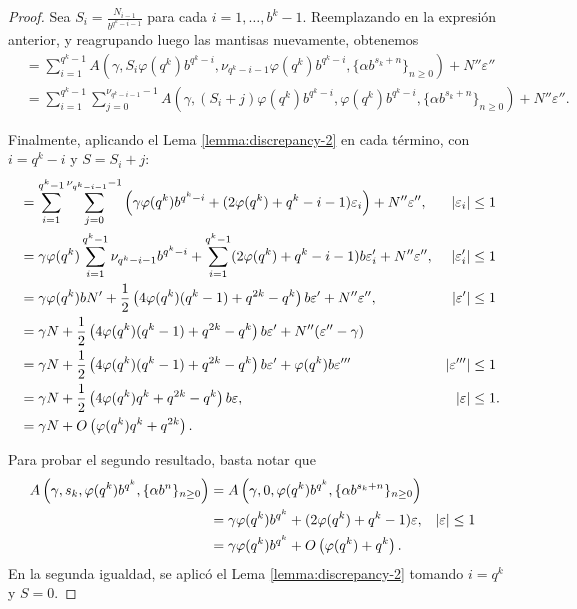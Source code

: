 \begin{proof}
Sea $S_i = \frac{N_{i-1}}{b^{q^k - i - 1}}$ para cada $i = 1, \dots, b^k - 1$.
Reemplazando en la expresión anterior, y reagrupando luego las mantisas
nuevamente, obtenemos
\begin{align*}
	&= \sum_{i=1}^{q^k-1} A\left(\gamma, S_i\varphi(q^k)b^{q^k-i},
		\nu_{q^k-i-1}\varphi(q^k)b^{q^k-i}, \lbrace \alpha b^{s_k+n}
		\rbrace_{n\geq0} \right) + N''\varepsilon'' \\
	&= \sum_{i=1}^{q^k-1} \sum_{j=0}^{\nu_{q^k-i-1}-1} A\left(\gamma,
		(S_i + j)\varphi(q^k)b^{q^k-i}, \varphi(q^k)b^{q^k-i},
		\lbrace \alpha b^{s_k+n} \rbrace_{n\geq0} \right) + N''\varepsilon''.
\end{align*}

Finalmente, aplicando el Lema \ref{lemma:discrepancy-2} en cada término,
con $i = q^k - i$ y $S = S_i + j$:
\begin{align*}
&= \sum_{i=1}^{q^k-1} \sum_{j=0}^{\nu_{q^k-i-1}-1} \left(
	\gamma\varphi(q^k)b^{q^k-i} + (2\varphi(q^k) + q^k - i - 1)\varepsilon_i
	\right) + N''\varepsilon'',
	& \vert \varepsilon_i \vert & \leq 1 \\
&= \gamma\varphi(q^k) \sum_{i=1}^{q^k-1} \nu_{q^k-i-1}b^{q^k-i} +
	\sum_{i=1}^{q^k-1} (2\varphi(q^k) + q^k - i - 1)b\varepsilon'_i
	+ N''\varepsilon'',
	& \vert \varepsilon_i' \vert & \leq 1 \\
&= \gamma\varphi(q^k)b N' + \frac{1}{2}\left(4\varphi(q^k)(q^k-1)
	+ q^{2k} - q^k \right)b\varepsilon' + N''\varepsilon'',
	& \vert \varepsilon' \vert & \leq 1 \\
&= \gamma N + \frac{1}{2}\left(4\varphi(q^k)(q^k-1)
	+ q^{2k} - q^k \right)b\varepsilon' + N''(\varepsilon'' - \gamma) \\
&= \gamma N + \frac{1}{2}\left(4\varphi(q^k)(q^k-1)
	+ q^{2k} - q^k \right)b\varepsilon' + \varphi(q^k)b\varepsilon'''
	& \vert \varepsilon''' \vert & \leq 1 \\
&= \gamma N + \frac{1}{2}\left(4\varphi(q^k)q^k
	+ q^{2k} - q^k \right)b\varepsilon,
	& \vert \varepsilon \vert & \leq 1. \\
&= \gamma N + O \left(\varphi(q^k)q^{k} + q^{2k}\right).
\end{align*}

\medskip

Para probar el segundo resultado, basta notar que
\begin{align*}
A\left(\gamma, s_k, \varphi(q^k)b^{q^k}, \lbrace \alpha b^{n} \rbrace_{n\geq0} \right)
	&= A\left(\gamma, 0, \varphi(q^k)b^{q^k}, \lbrace \alpha b^{s_k+n} \rbrace_{n\geq0} \right) \\
	&= \gamma\varphi(q^k)b^{q^k} + (2\varphi(q^k) + q^k - 1)\varepsilon,
		& \vert\varepsilon\vert &\leq 1 \\
	&= \gamma\varphi(q^k)b^{q^k} + O\left(\varphi(q^k) + q^k\right).
\end{align*}
En la segunda igualdad, se aplicó el Lema \ref{lemma:discrepancy-2} tomando
$i = q^k$ y $S = 0$.
\end{proof}

